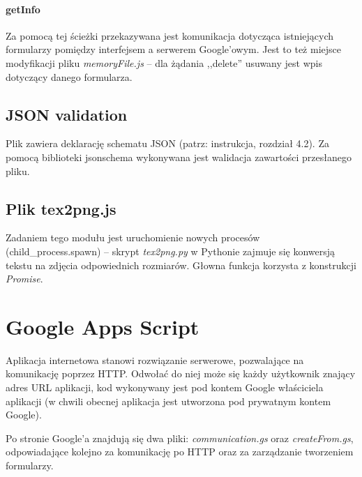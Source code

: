 \paragraph{getInfo} Za pomocą tej ścieżki  przekazywana jest komunikacja dotycząca istniejących formularzy pomiędzy interfejsem a serwerem Google'owym. Jest to też miejsce modyfikacji pliku \textit{memoryFile.js} -- dla żądania ,,delete'' usuwany jest wpis dotyczący danego formularza.
\subsection{JSON validation} Plik zawiera deklarację schematu JSON (patrz: instrukcja, rozdział 4.2). Za pomocą biblioteki jsonschema wykonywana jest walidacja zawartości przesłanego pliku.
\subsection{Plik tex2png.js} Zadaniem tego modułu jest uruchomienie nowych procesów (child\_process.spawn)  -- skrypt \textit{tex2png.py} w Pythonie zajmuje się konwersją tekstu na zdjęcia odpowiednich rozmiarów. Głowna funkcja korzysta z konstrukcji \textit{Promise}.

\section{Google Apps Script}
Aplikacja internetowa stanowi rozwiązanie serwerowe, pozwalające na komunikację poprzez HTTP. Odwołać do niej może się każdy użytkownik znający adres URL aplikacji, kod wykonywany jest pod kontem Google właściciela aplikacji (w chwili obecnej aplikacja jest utworzona pod prywatnym kontem Google).

\ind Po stronie Google'a znajdują się dwa pliki: \textit{communication.gs} oraz \textit{createFrom.gs}, odpowiadające kolejno za komunikację po HTTP oraz za zarządzanie tworzeniem formularzy. 

